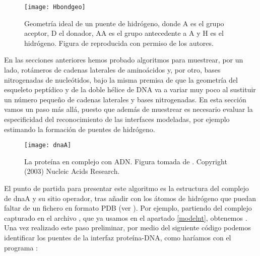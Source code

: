 \begin{figure}
\begin{center} 
\texttt{[image: Hbondgeo]}
\caption%
{
Geometr\'{i}a ideal de un puente de hidr\'{o}geno, donde A es el grupo aceptor, D el donador,
AA es el grupo antecedente a A y H es el hidr\'{o}geno.
Figura de \citet{McDonald1994} reproducida con permiso de los autores.
}
\label{fig:Hbondgeo}
\end{center}
\end{figure}

En las secciones anteriores hemos probado algoritmos para muestrear, por un lado, rot\'{a}meros de cadenas laterales 
de amino\'{a}cidos y, por otro, bases nitrogenadas de nucle\'{o}tidos, bajo la misma premisa de que la geometr\'{i}a 
del esqueleto pept\'{i}dico y de la doble h\'{e}lice de DNA va a variar muy poco al sustituir un n\'{u}mero peque\~no 
de cadenas laterales y bases nitrogenadas. En esta secci\'{o}n vamos un paso m\'{a}s all\'{a}, puesto 
que adem\'{a}s de muestrear es necesario evaluar la especificidad del reconocimiento de las interfaces modeladas, 
por ejemplo estimando la formaci\'{o}n de puentes de hidr\'{o}geno.

\begin{figure}
\begin{center} 
\texttt{[image: dnaA]}
\caption%
{
La prote\'{i}na  en complejo 
con ADN. Figura tomada de \cite{Fujikawa2003}. Copyright (2003) Nucleic Acids Research.
}
\label{fig:dnaA}
\end{center}
\end{figure} %

El punto de partida para presentar este algoritmo es la estructura del complejo de dnaA y su sitio operador, tras a\~nadir con
 los \'{a}tomos de hidr\'{o}geno que puedan faltar de un fichero
en formato PDB (ver ).
Por ejemplo, partiendo del complejo capturado en el archivo , 
que ya usamos en el apartado \ref{modelnt}, obtenemos . 
Una vez realizado este paso preliminar,
por medio del siguiente c\'{o}digo podemos identificar los puentes de la interfaz prote\'{i}na-DNA, como har\'{i}amos con el programa
 \citep{McDonald1994}:


